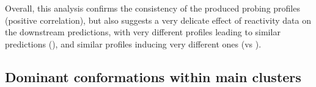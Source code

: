 \documentclass[11pt]{article} %
\begin{document}
Overall, this analysis confirms the consistency of the produced probing profiles (positive correlation), but also suggests a very delicate effect of reactivity data on the downstream predictions, with very different profiles leading to similar predictions (\OneMSevILU), and similar profiles inducing very different ones (\OneMSevILU vs \OneMSevILUThree).


\subsection{Dominant conformations within main clusters}

\begin{figure}[H]
{\centering
  \sf	\begin{adjustbox}{max width=\textwidth,max height=\textheight,keepaspectratio}
\begin{tabular}{@{}ccc@{}}


\end{tabular}
\end{adjustbox}}
\end{figure}
\end{document}
